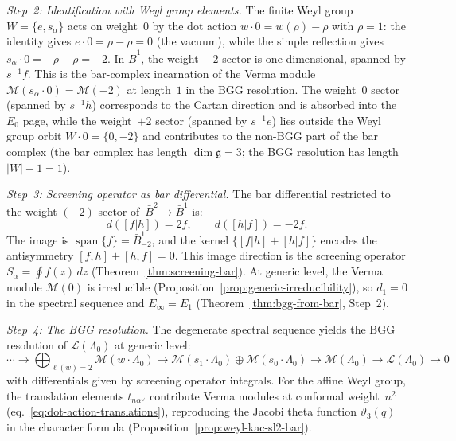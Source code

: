 \begin{computation}
\emph{Step~2: Identification with Weyl group elements.}
The finite Weyl group $W = \{e, s_\alpha\}$ acts on weight~$0$ by
the dot action $w \cdot 0 = w(\rho) - \rho$ with $\rho = 1$: the identity gives $e \cdot 0 = \rho - \rho = 0$ (the vacuum), while the simple reflection gives $s_\alpha \cdot 0 = -\rho - \rho = -2$.
In $\bar{B}^1$, the weight~$-2$ sector is one-dimensional,
spanned by $s^{-1}f$.  This is the bar-complex incarnation of the
Verma module $\mathcal{M}(s_\alpha \cdot 0) = \mathcal{M}(-2)$
at length~$1$ in the BGG resolution.  The weight~$0$ sector
(spanned by $s^{-1}h$) corresponds to the Cartan direction and
is absorbed into the $E_0$ page, while the weight~$+2$ sector
(spanned by $s^{-1}e$) lies outside the Weyl group orbit
$W \cdot 0 = \{0, -2\}$ and contributes to the
non-BGG part of the bar complex
(the bar complex has length $\dim \mathfrak{g} = 3$; the BGG
resolution has length $|W| - 1 = 1$).

\emph{Step~3: Screening operator as bar differential.}
The bar differential restricted to the weight-$(-2)$ sector
of~$\bar{B}^2 \to \bar{B}^1$ is:
\[
d([f|h]) = 2f, \qquad d([h|f]) = -2f.
\]
The image is $\operatorname{span}\{f\} = \bar{B}^1_{-2}$,
and the kernel $\{[f|h] + [h|f]\}$ encodes the antisymmetry
$[f,h] + [h,f] = 0$.  This image direction is the
screening operator $S_\alpha = \oint f(z)\,dz$
(Theorem~\ref{thm:screening-bar}).  At generic level, the
Verma module $\mathcal{M}(0)$ is irreducible
(Proposition~\ref{prop:generic-irreducibility}), so
$d_1 = 0$ in the spectral sequence and $E_\infty = E_1$
(Theorem~\ref{thm:bgg-from-bar}, Step~2).

\emph{Step~4: The BGG resolution.}
The degenerate spectral sequence yields the BGG resolution
of $\mathcal{L}(\Lambda_0)$ at generic level:
\begin{equation}\label{eq:bgg-sl2-generic}
\cdots \to \bigoplus_{\ell(w)=2} \mathcal{M}(w \cdot \Lambda_0)
\to \mathcal{M}(s_1 \cdot \Lambda_0)
   \oplus \mathcal{M}(s_0 \cdot \Lambda_0)
\to \mathcal{M}(\Lambda_0) \to \mathcal{L}(\Lambda_0) \to 0
\end{equation}
with differentials given by screening operator integrals.
For the affine Weyl group, the translation elements
$t_{n\alpha^\vee}$ contribute Verma modules at conformal
weight~$n^2$ (eq.~\eqref{eq:dot-action-translations}),
reproducing the Jacobi theta function $\vartheta_3(q)$ in the
character formula
(Proposition~\ref{prop:weyl-kac-sl2-bar}).


\end{computation}
